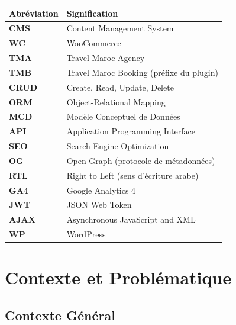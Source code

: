 \documentclass[12pt,a4paper]{report}
\begin{document}
\begin{table}[H]
\centering
\begin{tabularx}{0.9\linewidth}{>{\bfseries}lX}
  \toprule
  Abr\'eviation & Signification \\
  \midrule
  CMS     & Content Management System \\
  WC      & WooCommerce \\
  TMA     & Travel Maroc Agency \\
  TMB     & Travel Maroc Booking (pr\'efixe du plugin) \\
  CRUD    & Create, Read, Update, Delete \\
  ORM     & Object-Relational Mapping \\
  MCD     & Mod\`ele Conceptuel de Donn\'ees \\
  API     & Application Programming Interface \\
  SEO     & Search Engine Optimization \\
  OG      & Open Graph (protocole de m\'etadonn\'ees) \\
  RTL     & Right to Left (sens d'\'ecriture arabe) \\
  GA4     & Google Analytics 4 \\
  JWT     & JSON Web Token \\
  AJAX    & Asynchronous JavaScript and XML \\
  WP      & WordPress \\
  \bottomrule
\end{tabularx}
\end{table}

\clearpage
\tableofcontents
\clearpage
\listoftables
{}
\clearpage
\listoffigures
{}
\clearpage

\cleardoublepage
{}

\chapter{Contexte et Probl\'ematique}

\section{Contexte G\'en\'eral}
\end{document}
